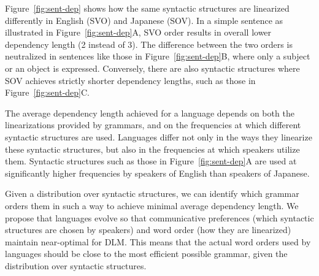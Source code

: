 \documentclass[9pt,twocolumn,twoside,lineno]{pnas-new}
\begin{document}
Figure~\ref{fig:sent-dep} shows how the same syntactic structures are linearized differently in English (SVO) and Japanese (SOV).
In a simple sentence as illustrated in Figure~\ref{fig:sent-dep}A, SVO order results in overall lower dependency length (2 instead of 3).
The difference between the two orders is neutralized in sentences like those in Figure~\ref{fig:sent-dep}B, where only a subject or an object is expressed.
Conversely, there are also syntactic structures where SOV achieves strictly shorter dependency lengths, such as those in Figure~\ref{fig:sent-dep}C.

The average dependency length achieved for a language depends on both the linearizations provided by grammars, and on the frequencies at which different syntactic structures are used.
Languages differ not only in the ways they linearize these syntactic structures, but also in the frequencies at which speakers utilize them.
Syntactic structures such as those in Figure~\ref{fig:sent-dep}A are used at significantly higher frequencies by speakers of English than speakers of Japanese.

Given a distribution over syntactic structures, we can identify which grammar orders them in such a way to achieve minimal average dependency length.
%
We propose that languages evolve so that communicative preferences (which syntactic structures are chosen by speakers) and word order (how they are linearized) maintain near-optimal for DLM.
This means that the actual word orders used by languages should be close to the most efficient possible grammar, given the distribution over syntactic structures.
\end{document}
